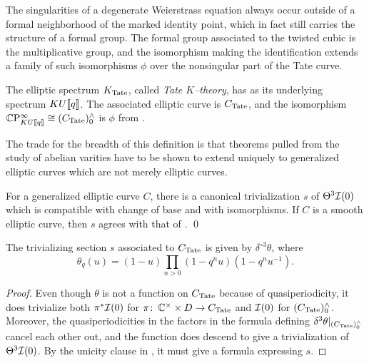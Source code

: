 \begin{remark}\label{TwistedCubicGivesGm}
The singularities of a degenerate Weierstrass equation always occur outside of a formal neighborhood of the marked identity point, which in fact still carries the structure of a formal group.  The formal group associated to the twisted cubic is the multiplicative group, and the isomorphism making the identification extends a family of such isomorphisms $\phi$ over the nonsingular part of the Tate curve.
\end{remark}

\begin{definition}
The elliptic spectrum $K_{\mathrm{Tate}}$, called \textit{Tate $K$--theory}, has as its underlying spectrum $KU\llbracket{q}\rrbracket$.  The associated elliptic curve is $C_{\mathrm{Tate}}$, and the isomorphism $\mathbb{C}\mathrm P^\infty_{KU\llbracket{q}\rrbracket} \cong (C_{\mathrm{Tate}})^\wedge_0$ is $\phi$ from .
\end{definition}

\noindent The trade for the breadth of this definition is that theorems pulled from the study of abelian varities have to be shown to extend uniquely to generalized elliptic curves which are not merely elliptic curves.

\begin{theorem}\label{GeneralizedTheta3IsTrivial}
For a generalized elliptic curve $C$, there is a canonical trivialization $s$ of $\Theta^3 \mathcal{I}(0)$ which is compatible with change of base and with isomorphisms.  If $C$ is a smooth elliptic curve, then $s$ agrees with that of . \qed
\end{theorem}

\begin{corollary}\label{D3thetaTrivializes}
The trivializing section $s$ associated to $C_{\mathrm{Tate}}$ is given by $\delta^{\circ 3} \theta$, where \[\theta_q(u) = (1 - u)\prod_{n > 0}(1 - q^n u)(1 - q^n u^{-1}).\]
\end{corollary}
\begin{proof}
Even though $\theta$ is not a function on $C_{\mathrm{Tate}}$ because of quasiperiodicity, it does trivialize both $\pi^* \mathcal{I}(0)$ for $\pi\colon\thinspace \mathbb{C}^\times \times D \to C_{\mathrm{Tate}}$ and $\mathcal{I}(0)$ for $(C_{\mathrm{Tate}})^\wedge_0$.  Moreover, the quasiperiodicities in the factors in the formula defining $\delta^3 \theta|_{(C_{\mathrm{Tate}})^\wedge_0}$ cancel each other out, and the function does descend to give a trivialization of $\Theta^3 \mathcal{I}(0)$.  By the unicity clause in , it must give a formula expressing $s$.
\end{proof}

